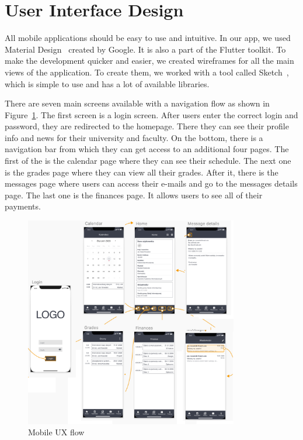 \section{User Interface Design}

All mobile applications should be easy to use and intuitive. In our app, we used Material Design~\cite{material-design} created by Google. It is also a part of the Flutter toolkit. To make the development quicker and easier, we created wireframes for all the main views of the application. To create them, we worked with a tool called Sketch~\cite{sketch}, which is simple to use and has a lot of available libraries.

There are seven main screens available with a navigation flow as shown in Figure~\ref{fig:ux-flow}. The first screen is a login screen. After users enter the correct login and password, they are redirected to the homepage. There they can see their profile info and news for their university and faculty. On the bottom, there is a navigation bar from which they can get access to an additional four pages. The first of the is the calendar page where they can see their schedule. The next one is the grades page where they can view all their grades. After it, there is the messages page where users can access their e-mails and go to the messages details page. The last one is the finances page. It allows users to see all of their payments.
\begin{figure}[htb]
    \centering
    \includegraphics[width=0.83\textwidth]{fig03/mobile_ux_flow-1-2x3.png}
    \caption{Mobile UX flow}
    \label{fig:ux-flow}
\end{figure}

